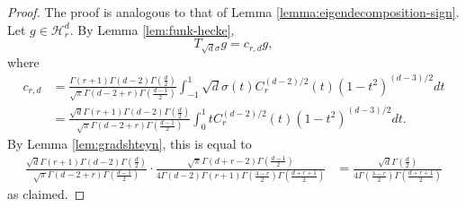 \documentclass{article}
\theoremstyle{definition}
\newcommand{\mc}{\mathcal}
\begin{document}
\begin{proof}
    The proof is analogous to that of Lemma \ref{lemma:eigendecomposition-sign}. Let $g \in \mc{H}_r^d$. By Lemma \ref{lem:funk-hecke},
    \[T_{\sqrt{d}\sigma}g = c_{r, d} g, \]
    where
    \begin{align*}
        c_{r, d} &= \frac{\Gamma(r + 1)\Gamma(d - 2)\Gamma\left(\frac{d}{2}\right)  }{\sqrt{\pi}\Gamma(d - 2 + r)\Gamma\left(\frac{d - 1}{2}\right) } \int_{-1}^1 \sqrt{d}\sigma(t) C_r^{(d - 2)/2}(t)(1 - t^2)^{(d - 3)/2}dt\\
        &= \frac{\sqrt{d}\Gamma(r + 1)\Gamma(d - 2)\Gamma\left(\frac{d}{2}\right)  }{\sqrt{\pi}\Gamma(d - 2 + r)\Gamma\left(\frac{d - 1}{2}\right) } \int_0^1 t C_r^{(d - 2)/2}(t)(1 - t^2)^{(d - 3)/2}dt.
    \end{align*}
    By Lemma \ref{lem:gradshteyn}, this is equal to
    \begin{align*}
        \frac{\sqrt{d}\Gamma(r + 1)\Gamma(d - 2)\Gamma\left(\frac{d}{2}\right)  }{\sqrt{\pi}\Gamma(d - 2 + r)\Gamma\left(\frac{d - 1}{2}\right) } \cdot \frac{\sqrt{\pi}\Gamma(d + r - 2)\Gamma\left(\frac{d - 1}{2}\right) }{4\Gamma(d - 2)\Gamma(r + 1)\Gamma\left(\frac{3 - r}{2}\right)\Gamma\left(\frac{d + r + 1}{2}\right) } &= \frac{\sqrt{d}\Gamma\left(\frac{d}{2}\right) }{4\Gamma\left(\frac{3 - r}{2}\right)\Gamma\left(\frac{d + r + 1}{2}\right)  }
    \end{align*}
    as claimed.


\end{proof}
\end{document}

